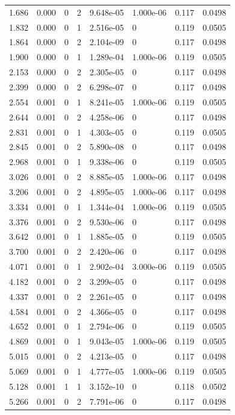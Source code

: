 \documentclass[preview]{standalone}
\begin{document}
{{\begin{tabular}{L{1.2cm}C{1.2cm} C{0.3cm}C{0.5cm} C{1.4cm}C{1.4cm} C{1.4cm}C{1.4cm}}
  1.686  &  0.000  & 0     &  2 &  9.648e-05  & 1.000e-06  & 0.117 &  0.0498   \\ 
  1.832  &  0.000  & 0     &  1 &  2.516e-05  & 0  & 0.119 &  0.0505   \\ 
  1.864  &  0.000  & 0     &  2 &  2.104e-09  & 0  & 0.117 &  0.0498   \\ 
  1.900  &  0.000  & 0     &  1 &  1.289e-04  & 1.000e-06  & 0.119 &  0.0505   \\ 
  2.153  &  0.000  & 0     &  2 &  2.305e-05  & 0  & 0.117 &  0.0498   \\ 
  2.399  &  0.000  & 0     &  2 &  6.298e-07  & 0  & 0.117 &  0.0498   \\ 
  2.554  &  0.001  & 0     &  1 &  8.241e-05  & 1.000e-06  & 0.119 &  0.0505   \\ 
  2.644  &  0.001  & 0     &  2 &  4.258e-06  & 0  & 0.117 &  0.0498   \\ 
  2.831  &  0.001  & 0     &  1 &  4.303e-05  & 0  & 0.119 &  0.0505   \\ 
  2.845  &  0.001  & 0     &  2 &  5.890e-08  & 0  & 0.117 &  0.0498   \\ 
  2.968  &  0.001  & 0     &  1 &  9.338e-06  & 0  & 0.119 &  0.0505   \\ 
  3.026  &  0.001  & 0     &  2 &  8.885e-05  & 1.000e-06  & 0.117 &  0.0498   \\ 
  3.206  &  0.001  & 0     &  2 &  4.895e-05  & 1.000e-06  & 0.117 &  0.0498   \\ 
  3.334  &  0.001  & 0     &  1 &  1.344e-04  & 1.000e-06  & 0.119 &  0.0505   \\ 
  3.376  &  0.001  & 0     &  2 &  9.530e-06  & 0  & 0.117 &  0.0498   \\ 
  3.642  &  0.001  & 0     &  1 &  1.885e-05  & 0  & 0.119 &  0.0505   \\ 
  3.700  &  0.001  & 0     &  2 &  2.420e-06  & 0  & 0.117 &  0.0498   \\ 
  4.071  &  0.001  & 0     &  1 &  2.902e-04  & 3.000e-06  & 0.119 &  0.0505   \\ 
  4.182  &  0.001  & 0     &  2 &  3.299e-05  & 0  & 0.117 &  0.0498   \\ 
  4.337  &  0.001  & 0     &  2 &  2.261e-05  & 0  & 0.117 &  0.0498   \\ 
  4.584  &  0.001  & 0     &  2 &  4.366e-05  & 0  & 0.117 &  0.0498   \\ 
  4.652  &  0.001  & 0     &  1 &  2.794e-06  & 0  & 0.119 &  0.0505   \\ 
  4.869  &  0.001  & 0     &  1 &  9.043e-05  & 1.000e-06  & 0.119 &  0.0505   \\ 
  5.015  &  0.001  & 0     &  2 &  4.213e-05  & 0  & 0.117 &  0.0498   \\ 
  5.069  &  0.001  & 0     &  1 &  4.777e-05  & 1.000e-06  & 0.119 &  0.0505   \\ 
  5.128  &  0.001  & 1     &  1 &  3.152e-10  & 0  & 0.118 &  0.0502   \\ 
  5.266  &  0.001  & 0     &  2 &  7.791e-06  & 0  & 0.117 &  0.0498   \\ 
\hline 
\end{tabular} 

}}
\end{document}
